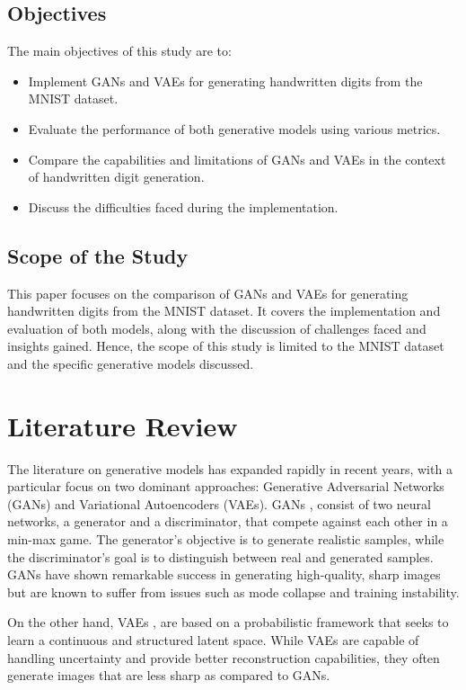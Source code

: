 \documentclass{article}
\begin{document}
\subsection{Objectives}
The main objectives of this study are to:
\begin{itemize}
    \item Implement GANs and VAEs for generating handwritten digits from the MNIST dataset.
    \item Evaluate the performance of both generative models using various metrics.
    \item Compare the capabilities and limitations of GANs and VAEs in the context of handwritten digit generation.
    \item Discuss the difficulties faced during the implementation.
\end{itemize}

\subsection{Scope of the Study}
This paper focuses on the comparison of GANs and VAEs for generating handwritten digits from the MNIST dataset. It covers the implementation and evaluation of both models, along with the discussion of challenges faced and insights gained. Hence, the scope of this study is limited to the MNIST dataset and the specific generative models discussed.

\section{Literature Review}
The literature on generative models has expanded rapidly in recent years, with a particular focus on two dominant approaches: Generative Adversarial Networks (GANs) and Variational Autoencoders (VAEs). GANs \cite{goodfellow2014generative}, consist of two neural networks, a generator and a discriminator, that compete against each other in a min-max game. The generator's objective is to generate realistic samples, while the discriminator's goal is to distinguish between real and generated samples. GANs have shown remarkable success in generating high-quality, sharp images but are known to suffer from issues such as mode collapse and training instability.

On the other hand, VAEs \cite{kingma2022autoencoding}, are based on a probabilistic framework that seeks to learn a continuous and structured latent space. While VAEs are capable of handling uncertainty and provide better reconstruction capabilities, they often generate images that are less sharp as compared to GANs.
\end{document}
